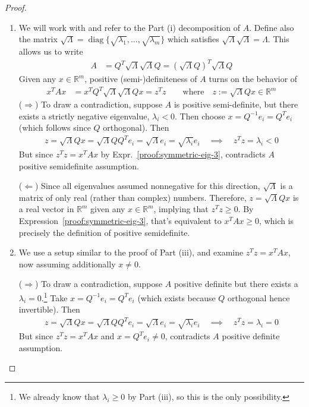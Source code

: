 \documentclass[12pt]{article}
\numberwithin{equation}{section} %
\theoremstyle{plain}
\theoremstyle{definition}
\theoremstyle{remark}
\newcommand{\diag}{\operatorname{diag}}
\newcommand{\Rm}{\mathbb{R}^m}
\begin{document}
\begin{proof}
\begin{enumerate}[label=(\roman*)]
  \item
    We will work with and refer to the Part (i) decomposition of $A$.
    Define also the matrix
    $\sqrt{\Lambda}=\diag\{\sqrt{\lambda_1},\ldots,\sqrt{\lambda_m}\}$
    which satisfies $\sqrt{\Lambda}\sqrt{\Lambda}=\Lambda$.
    This allows us to write
    \begin{align*}
      A &= Q^T \sqrt{\Lambda} \sqrt{\Lambda} Q
      = \left(\sqrt{\Lambda} Q\right)^T \sqrt{\Lambda} Q
    \end{align*}
    Given any $x\in\Rm$, positive (semi-)definiteness of $A$ turns on
    the behavior of
    \begin{align}
      x^T A x &=
      x^T Q^T \sqrt{\Lambda} \sqrt{\Lambda} Q x
      = z^Tz
      \qquad\text{where}\quad
      z := \sqrt{\Lambda}Qx\in\Rm
      \label{proof:symmetric-eig-3}
    \end{align}
    ($\Rightarrow$)
    To draw a contradiction, suppose $A$ is positive semi-definite, but
    there exists a strictly negative eigenvalue, $\lambda_i<0$.
    Then choose $x=Q^{-1}e_i = Q^Te_i$ (which follows since $Q$
    orthogonal). Then
    \begin{align*}
      z=\sqrt{\Lambda}Qx
      =\sqrt{\Lambda}QQ^Te_i
      =\sqrt{\Lambda}e_i
      = \sqrt{\lambda_i}e_i
      \quad\implies\quad
      z^Tz = \lambda_i<0
    \end{align*}
    But since $z^Tz=x^TAx$ by Expr.~\ref{proof:symmetric-eig-3},
    contradicts $A$ positive semidefinite assumption.

    ($\Leftarrow$)
    Since all eigenvalues assumed nonnegative for this direction,
    $\sqrt{\Lambda}$ is a matrix of only real (rather than complex)
    numbers. Therefore, $z = \sqrt{\Lambda} Qx$ is a real vector in
    $\Rm$ given any $x\in\Rm$, implying that
    $z^Tz\geq 0$.
    By Expression~\ref{proof:symmetric-eig-3}, that's equivalent to
    $x^TAx\geq 0$, which is precisely the definition of positive
    semidefinite.

  \item
    We use a setup similar to the proof of Part (iii),
    and examine $z^Tz=x^TAx$, now assuming additionally $x\neq 0$.

    ($\Rightarrow$)
    To draw a contradiction, suppose $A$ positive definite but there
    exists a $\lambda_i=0$.\footnote{%
      We already know that $\lambda_i\geq 0$ by Part (iii), so this is
      the only possibility.
    }
    Take $x=Q^{-1}e_i=Q^Te_i$ (which exists because $Q$ orthogonal hence
    invertible). Then
    \begin{align*}
      z
      = \sqrt{\Lambda}Qx
      = \sqrt{\Lambda}QQ^Te_i
      = \sqrt{\Lambda}e_i
      = \sqrt{\lambda_i}e_i
      \quad\implies\quad
      z^Tz = \lambda_i = 0
    \end{align*}
    But since $z^Tz=x^TAx$ and $x=Q^Te_i\neq 0$, contradicts $A$
    positive definite assumption.


\end{enumerate}
\end{proof}
\end{document}

